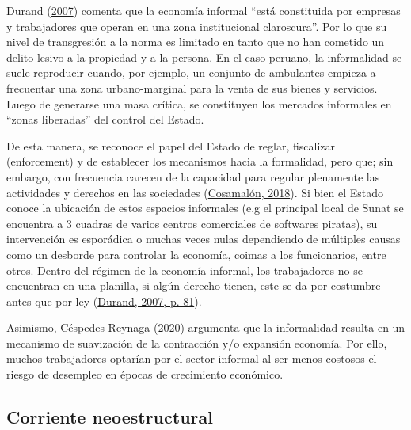 \documentclass[
  letterpaper,
  12pt,
  oneside,
  spanish,
  doublespacing,
  headsepline,
  parskip]{MastersDoctoralThesis}
\begin{document}
Durand (\protect\hyperlink{ref-durand2007}{2007}) comenta que la
economía informal ``está constituida por empresas y trabajadores que
operan en una zona institucional claroscura''. Por lo que su nivel de
transgresión a la norma es limitado en tanto que no han cometido un
delito lesivo a la propiedad y a la persona. En el caso peruano, la
informalidad se suele reproducir cuando, por ejemplo, un conjunto de
ambulantes empieza a frecuentar una zona urbano-marginal para la venta
de sus bienes y servicios. Luego de generarse una masa crítica, se
constituyen los mercados informales en ``zonas liberadas'' del control
del Estado.

De esta manera, se reconoce el papel del Estado de reglar, fiscalizar
(enforcement) y de establecer los mecanismos hacia la formalidad, pero
que; sin embargo, con frecuencia carecen de la capacidad para regular
plenamente las actividades y derechos en las sociedades
(\protect\hyperlink{ref-cosamaluxf3n2018}{Cosamalón, 2018}). Si bien el
Estado conoce la ubicación de estos espacios informales (e.g el
principal local de Sunat se encuentra a 3 cuadras de varios centros
comerciales de softwares piratas), su intervención es esporádica o
muchas veces nulas dependiendo de múltiples causas como un desborde para
controlar la economía, coimas a los funcionarios, entre otros. Dentro
del régimen de la economía informal, los trabajadores no se encuentran
en una planilla, si algún derecho tienen, este se da por costumbre antes
que por ley (\protect\hyperlink{ref-durand2007}{Durand, 2007, p. 81}).

Asimismo, Céspedes Reynaga
(\protect\hyperlink{ref-cuxe9spedesreynaga2020}{2020}) argumenta que la
informalidad resulta en un mecanismo de suavización de la contracción
y/o expansión economía. Por ello, muchos trabajadores optarían por el
sector informal al ser menos costosos el riesgo de desempleo en épocas
de crecimiento económico.

\hypertarget{corriente-neoestructural}{%
\subsection{Corriente neoestructural}\label{corriente-neoestructural}}
\end{document}
